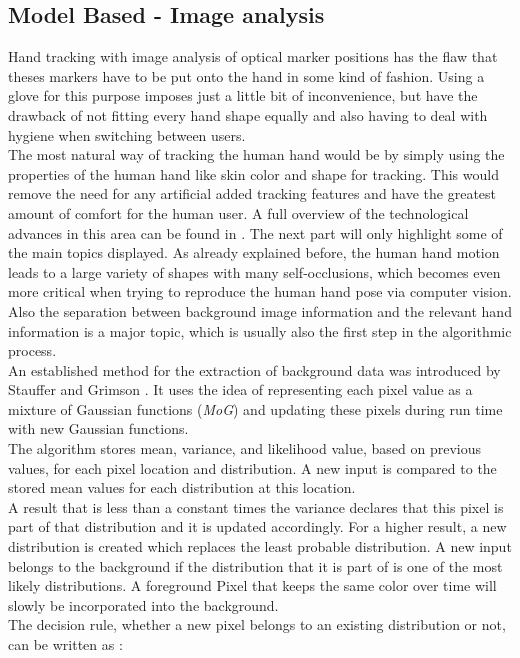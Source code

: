 \subsection{Model Based - Image analysis}
Hand tracking with image analysis of optical marker positions has the flaw that theses markers have to be put onto the hand in some kind of fashion. Using a glove for this purpose imposes just a little bit of inconvenience, but have the drawback of not fitting every hand shape equally and also having to deal with hygiene when switching between users.\\The most natural way of tracking the human hand would be by simply using the properties of the human hand like skin color and shape for tracking. This would remove the need for any artificial added tracking features and have the greatest amount of comfort for the human user.
A full overview of the technological advances in this area can be found in \cite{Moeslund.2006,Moeslund.2001}. The next part will only highlight some of the main topics displayed.\newpage
As already explained before, the human hand motion leads to a large variety of shapes with many self-occlusions, which becomes even more critical when trying to reproduce the human hand pose via computer vision. Also the separation between background image information and the relevant hand information is a major topic, which is usually also the first step in the algorithmic process.\\
An established method for the extraction of background data was introduced by Stauffer and Grimson \cite{Stauffer.1999}. It uses the idea of representing each pixel value as a mixture of Gaussian functions (\textit{MoG}) and updating these pixels during run time with new Gaussian functions.\\
The algorithm stores mean, variance, and likelihood value, based on previous values, for each pixel location and distribution. 
A new input is compared to the stored mean values for each distribution at this location.\\
A result that is less than a constant times the variance declares that this pixel is part of that distribution and it is updated accordingly. For a higher result, a new distribution is created which replaces the least probable distribution. A new input belongs to the background if the distribution that it is part of is one of the most likely distributions.
A foreground Pixel that keeps the same color over time will slowly be incorporated into the background.\\
The decision rule, whether a new pixel belongs to an existing distribution or not, can be written as \cite{Kristensen.Feb.2007}:\\
